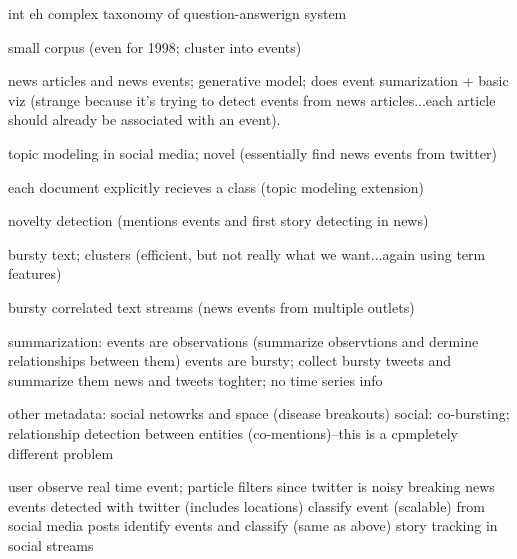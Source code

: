 \cite{pustejovsky2003timeml} int eh complex taxonomy of question-answerign system


\cite{allan1998line} small corpus (even for 1998; cluster into events) 

\cite{li2005probabilistic} news articles and news events; generative model; does event sumarization + basic viz (strange because it's trying to detect events from news articles...each article should already be associated with an event).  


\cite{lau2012line} topic modeling in social media; novel  (essentially find news events from twitter)

\cite{VanDam:2012} each document explicitly recieves a class (topic modeling extension)

\cite{zhang2002novelty} novelty detection (mentions events and first story detecting in news)

\cite{zhao2012novel} bursty text; clusters (efficient, but not really what we want...again using term features)

\cite{wang2007mining} bursty correlated text streams (news events from multiple outlets)


summarization:
\cite{peng2007event} events are observations (summarize observtions and dermine relationships between them)
\cite{chakrabarti2011event} events are bursty; collect bursty tweets and summarize them
\cite{gao2012joint} news and tweets toghter; no time series info


\PP other metadata: social netowrks and space (disease breakouts)
social: 
\cite{das2011dynamic} co-bursting; relationship detection between entities (co-mentions)--this is a cpmpletely different problem

\cite{sakaki2010earthquake} user observe real time event; particle filters since twitter is noisy
\cite{jackoway2011identification} breaking news events detected with twitter (includes locations)
\cite{reuter2012event} classify event (scalable) from social media posts
\cite{becker2010learning} identify events and classify (same as above)
\cite{sayyadi2009event} story tracking in social streams

